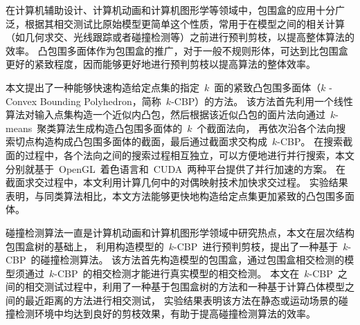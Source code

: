 \begin{cabstract}
  
在计算机辅助设计、计算机动画和计算机图形学等领域中，包围盒的应用十分广泛，根据其相交测试比原始模型更简单这个性质，常用于在模型之间的相关计算（如几何求交、光线跟踪或者碰撞检测等）之前进行预判剪枝，以提高整体算法的效率。
凸包围多面体作为包围盒的推广，对于一般不规则形体，可达到比包围盒更好的紧致程度，因而能够更好地进行预判剪枝以提高算法的整体效率。

本文提出了一种能够快速构造给定点集的指定~$k$~面的紧致凸包围多面体（$k$ - Convex Bounding Polyhedron，简称~$k$-CBP）的方法。
该方法首先利用一个线性算法对输入点集构造一个近似内凸包，然后根据该近似凸包的面片法向通过~$k$-means~聚类算法生成构造凸包围多面体的~$k$~个截面法向，
再依次沿各个法向搜索切点构造构成凸包围多面体的截面，最后通过截面求交构成~$k$-CBP。 
在搜索截面的过程中，各个法向之间的搜索过程相互独立，可以方便地进行并行搜索，本文分别就基于~OpenGL~着色语言和~CUDA~两种平台提供了并行加速的方案。
在截面求交过程中，本文利用计算几何中的对偶映射技术加快求交过程。
实验结果表明，与同类算法相比，本文方法能够更快地构造给定点集更加紧致的凸包围多面体。

碰撞检测算法一直是计算机动画和计算机图形学领域中研究热点，本文在层次结构包围盒树的基础上，
利用构造模型的~$k$-CBP~进行预判剪枝，提出了一种基于~$k$-CBP~的碰撞检测算法。
该方法首先构造模型的包围盒，通过包围盒相交检测的模型须通过~$k$-CBP~的相交检测才能进行真实模型的相交检测。
本文在~$k$-CBP~之间的相交测试过程中，利用了一种基于包围盒树的方法和一种基于计算凸体模型之间的最近距离的方法进行相交测试，
实验结果表明该方法在静态或运动场景的碰撞检测环境中均达到良好的剪枝效果，有助于提高碰撞检测算法的效率。



\end{cabstract}


